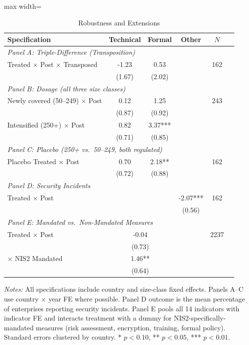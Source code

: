 \begin{table}[H]
\centering
\caption{Robustness and Extensions}
\label{tab:robustness}
\begin{threeparttable}
\begin{adjustbox}{max width=\textwidth}
\begin{tabular}{lccccc}
\toprule
Specification & Technical & Formal & Other & $N$ \\
\midrule
\multicolumn{5}{l}{\textit{Panel A: Triple-Difference (Transposition)}} \\
Treated $\times$ Post $\times$ Transposed & -1.23 & 0.53 & & 162 \\
 & (1.67) & (2.02) & & \\
\midrule
\multicolumn{5}{l}{\textit{Panel B: Dosage (all three size classes)}} \\
Newly covered (50--249) $\times$ Post & 0.12 & 1.25 & & 243 \\
 & (0.87) & (0.92) & & \\
Intensified (250+) $\times$ Post & 0.82 & 3.37*** & & \\
 & (0.71) & (0.85) & & \\
\midrule
\multicolumn{5}{l}{\textit{Panel C: Placebo (250+ vs.\ 50--249, both regulated)}} \\
Placebo Treated $\times$ Post & 0.70 & 2.18** & & 162 \\
 & (0.72) & (0.88) & & \\
\midrule
\multicolumn{5}{l}{\textit{Panel D: Security Incidents}} \\
Treated $\times$ Post & & & -2.07*** & 162 \\
 & & & (0.56) & \\
\midrule
\multicolumn{5}{l}{\textit{Panel E: Mandated vs.\ Non-Mandated Measures}} \\
Treated $\times$ Post & \multicolumn{2}{c}{-0.04} & & 2237 \\
 & \multicolumn{2}{c}{(0.73)} & & \\
$\times$ NIS2 Mandated & \multicolumn{2}{c}{1.46**} & & \\
 & \multicolumn{2}{c}{(0.64)} & & \\
\bottomrule
\end{tabular}
\end{adjustbox}
\begin{tablenotes}[flushleft]
\small
\item \textit{Notes:} All specifications include country and size-class fixed effects. Panels A--C use country $\times$ year FE where possible. Panel D outcome is the mean percentage of enterprises reporting security incidents. Panel E pools all 14 indicators with indicator FE and interacts treatment with a dummy for NIS2-specifically-mandated measures (risk assessment, encryption, training, formal policy). Standard errors clustered by country. * $p<0.10$, ** $p<0.05$, *** $p<0.01$.
\end{tablenotes}
\end{threeparttable}
\end{table}
